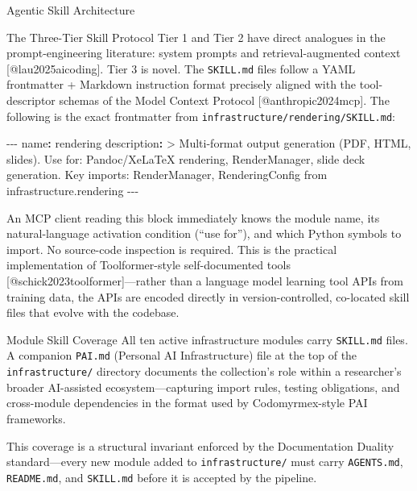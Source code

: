 \documentclass[
  ignorenonframetext,
]{beamer}
\newenvironment{Shaded}{}{}
\newcommand{\AttributeTok}[1]{\textcolor[rgb]{0.49,0.56,0.16}{#1}}
\newcommand{\CharTok}[1]{\textcolor[rgb]{0.25,0.44,0.63}{#1}}
\newcommand{\FunctionTok}[1]{\textcolor[rgb]{0.02,0.16,0.49}{#1}}
\newcommand{\KeywordTok}[1]{\textcolor[rgb]{0.00,0.44,0.13}{\textbf{#1}}}
\newcommand{\NormalTok}[1]{#1}
\newcommand{\PreprocessorTok}[1]{\textcolor[rgb]{0.74,0.48,0.00}{#1}}
\begin{document}
\begin{frame}[fragile]{Agentic Skill Architecture}
\begin{block}{The Three-Tier Skill Protocol}
Tier 1 and Tier 2 have direct analogues in the prompt-engineering
literature: system prompts and retrieval-augmented context
{[}@lau2025aicoding{]}. Tier 3 is novel. The \texttt{SKILL.md} files
follow a YAML frontmatter + Markdown instruction format precisely
aligned with the tool-descriptor schemas of the Model Context Protocol
{[}@anthropic2024mcp{]}. The following is the exact frontmatter from
\texttt{infrastructure/rendering/SKILL.md}:

\begin{Shaded}
\begin{Highlighting}[]
\PreprocessorTok{{-}{-}{-}}
\FunctionTok{name}\KeywordTok{:}\AttributeTok{ rendering}
\FunctionTok{description}\KeywordTok{: }\CharTok{\textgreater{}}
\NormalTok{  Multi{-}format output generation (PDF, HTML, slides).}
\NormalTok{  Use for: Pandoc/XeLaTeX rendering, RenderManager, slide deck generation.}
\NormalTok{  Key imports: RenderManager, RenderingConfig from infrastructure.rendering}
\PreprocessorTok{{-}{-}{-}}
\end{Highlighting}
\end{Shaded}

An MCP client reading this block immediately knows the module name, its
natural-language activation condition (``use for''), and which Python
symbols to import. No source-code inspection is required. This is the
practical implementation of Toolformer-style self-documented tools
{[}@schick2023toolformer{]}---rather than a language model learning tool
APIs from training data, the APIs are encoded directly in
version-controlled, co-located skill files that evolve with the
codebase.
\end{block}

\begin{block}{Module Skill Coverage}
\protect{}\label{module-skill-coverage}
All ten active infrastructure modules carry \texttt{SKILL.md} files. A
companion \texttt{PAI.md} (Personal AI Infrastructure) file at the top
of the \texttt{infrastructure/} directory documents the collection's
role within a researcher's broader AI-assisted ecosystem---capturing
import rules, testing obligations, and cross-module dependencies in the
format used by Codomyrmex-style PAI frameworks.

This coverage is a structural invariant enforced by the Documentation
Duality standard---every new module added to \texttt{infrastructure/}
must carry \texttt{AGENTS.md}, \texttt{README.md}, and \texttt{SKILL.md}
before it is accepted by the pipeline.
\end{block}


\end{frame}
\end{document}
